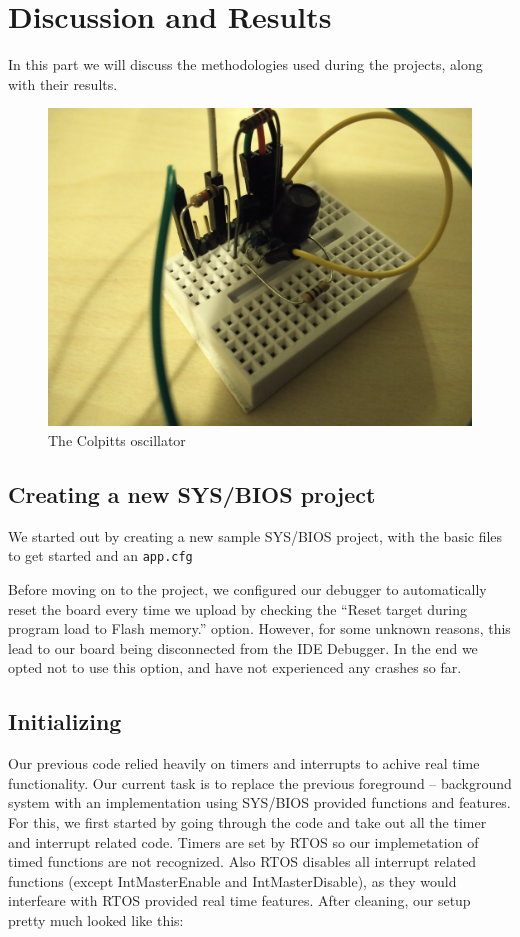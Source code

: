 \documentclass[12pt,oneside,letterpaper]{article}
\begin{document}
\section{Discussion and Results}
In this part we will discuss the methodologies used during the projects, along with their results.
\begin{figure}[h]
  \includegraphics[width=\linewidth]{assets/circuit.jpg}
  \caption{The Colpitts oscillator}
  \label{fig:circuit}
\end{figure}

\subsection{Creating a new SYS/BIOS project}

We started out by creating a new sample SYS/BIOS project, with the basic files to get started and an \texttt{app.cfg}

Before moving on to the project, we configured our debugger to automatically reset the board every time we upload by checking the “Reset target during program load to Flash memory.” option. However, for some unknown reasons, this lead to our board being disconnected from the IDE Debugger. In the end we opted not to use this option, and have not experienced any crashes so far. 

\subsection{Initializing}
Our previous code relied heavily on timers and interrupts to achive real time functionality. Our current task is to replace the previous foreground – background system with an implementation using SYS/BIOS provided functions and features. For this, we first started by going through the code and take out all the timer and interrupt related code. Timers are set by RTOS so our implemetation of timed functions are not recognized. Also RTOS disables all interrupt related functions (except IntMasterEnable and IntMasterDisable), as they would interfeare with RTOS provided real time features. After cleaning, our setup pretty much looked like this:
\end{document}
